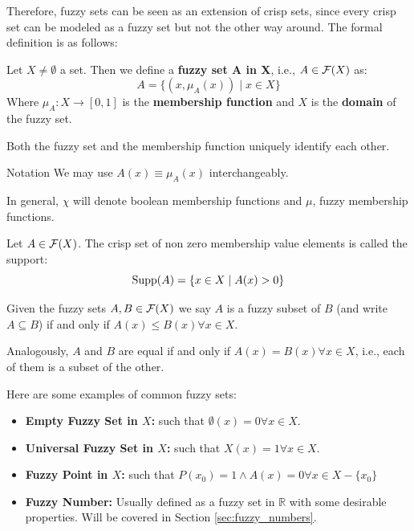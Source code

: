 Therefore, fuzzy sets can be seen as an extension of crisp sets, since every crisp set can be modeled as a fuzzy set but not the other way around. The formal definition is as follows:

\begin{definition}
    Let $X\neq\emptyset$ a set. Then we define a \textbf{fuzzy set A in X}, i.e., $A \in \mathcal{F}(X)$ as:
    \[A=\{(x,\mu_A(x))\mid x\in X\}\]
    Where $\mu_A:X\longrightarrow [0,1]$ is the \textbf{membership function} and $X$ is the \textbf{domain} of the fuzzy set.
\end{definition}

\begin{remark}
     Both the fuzzy set and the membership function uniquely identify each other.
\end{remark}

\begin{notation}{Notation}
    We may use \( A(x) \equiv \mu_A(x) \) interchangeably.

    In general, $\chi$ will denote boolean membership functions and $\mu$, fuzzy membership functions.
\end{notation}



\begin{definition}[Support]
    Let $A \in \mathcal{F}(X)$. The crisp set of non zero membership value elements is called the support:
    \[\textnormal{Supp}(A)=\{x\in X \mid A(x)>0\}\]
\end{definition}

\begin{definition}
    Given the fuzzy sets $A, B \in \mathcal{F}(X)$ we say $A$ is a fuzzy subset of $B$ (and write $A \subseteq B$) if and only if $A(x)
    \leq B(x) \forall x \in X$.

    Analogously, $A$ and $B$ are equal if and only if $A(x)=B(x) \forall x \in X$, i.e., each of them is a subset of the other.
\end{definition}

\begin{example}
    Here are some examples of common fuzzy sets:
    \begin{itemize}
        \item \textbf{Empty Fuzzy Set in $X$:} such that $\emptyset(x)=0 \forall x \in X$.
        \item \textbf{Universal Fuzzy Set in $X$:} such that $X(x)=1  \forall x \in X$.
        \item \textbf{Fuzzy Point in $X$:} such that $P(x_0)=1 \land A(x)=0 \forall x \in X-\{x_0\}$
        \item \textbf{Fuzzy Number:} Usually defined as a fuzzy set in $\mathbb{R}$ with some desirable properties. Will be covered in Section \ref{sec:fuzzy_numbers}.
    \end{itemize}
\end{example}
